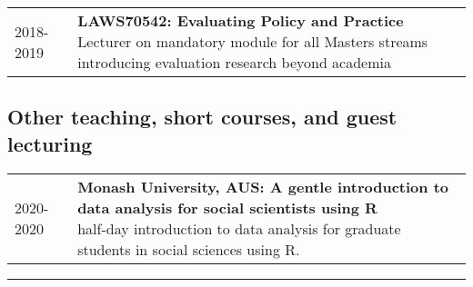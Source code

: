 \documentclass[10pt,a4paper,]{article}
\makeatletter
\def\briefitem#1#2#3{
#2 & \parbox[t]{0.85\textwidth}{%
      \textbf{#1}\\[-0.1cm]{\footnotesize #3}}\\[0.4cm]}
\def\briefsection#1{\begin{longtable}{@{\extracolsep{\fill}}ll}#1\end{longtable}}
\makeatother
\begin{document}
\briefsection{\briefitem{LAWS70542: Evaluating Policy and Practice}{2018-2019}{Lecturer on mandatory module for all Masters streams introducing evaluation research beyond academia}\briefitem{LAWS70311: Designing Criminological Research}{2016-present}{Course director and primary lecturer on compulsory research methods module for all Masters streams}\briefitem{LAWS70821: Data Analysis with R \& R Studio}{2016-2019}{2016: Course director and sole lecturer, 2018 onwards: ad-hoc lecturer on introductory statistics for MRes students using R}}

\hypertarget{other-teaching-short-courses-and-guest-lecturing}{%
\subsection{Other teaching, short courses, and guest lecturing}\label{other-teaching-short-courses-and-guest-lecturing}}

\briefsection{\briefitem{Monash University, AUS: A gentle introduction to data analysis for social scientists using R}{2020-2020}{half-day introduction to data analysis for graduate students in social sciences using R.
}\briefitem{Research IT: Data analysis using R}{2019-2019}{One-day introduction to R, part of University of Manchester's Research IT series of courses for staff and PhD students.
}\briefitem{University of Amsterdam: Crowdsourced data and a crime science approach to perception of crime and place}{2018-2018}{Crime Science module for masters level students.
}\briefitem{methods@manchester: Getting Started in R: introduction to data analysis \& visualisation}{2017-present}{Week-long intensive course introducing students to using R and R Studio for data analysis. Open to all, usually attended by professionals and academics.
}\briefitem{Q-Step internship preparation: Introduction to mapping data with QGIS}{2017-present}{Afternoon short introduction to mapping spatial data for Q-step internship students.
}\briefitem{Stockholm Royal Institute of Technology (KTH): Spatial Data Analysis in Practice}{2017-2017}{One-day introduction to mapping with QGIS and data collection from APIs as part of weeklong summer school for PhD students.
}\briefitem{University College London MSc Transport Studies: Trasport Safety and Security}{2012-2017}{Guest lecture for graduate module, UCL Department of Civil, Environmental, and Geomatic Engineering.
}}

\begin{center}\rule{0.5\linewidth}{0.5pt}\end{center}
\end{document}
